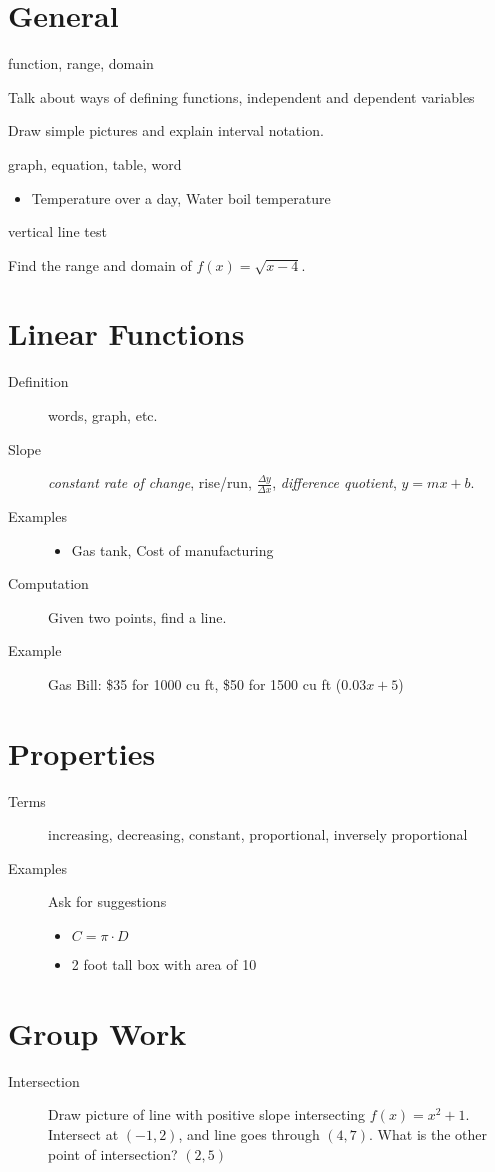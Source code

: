 \documentclass[11pt]{article}
\begin{document}
\drawtitle

\section*{General}
\begin{description}
\item[Definitions] function, range, domain
\item Talk about ways of defining functions, independent and dependent variables
\item Draw simple pictures and explain interval notation.
\item[Examples] graph, equation, table, word
  \begin{itemize}
  \item Temperature over a day, Water boil temperature
  \end{itemize}
\item[Check] vertical line test
\item[Example] Find the range and domain of $f(x)=\sqrt{x-4}$.
\end{description}

\section*{Linear Functions}
\begin{description}
\item[Definition] words, graph, etc.
\item[Slope] \textit{constant rate of change}, rise/run, $\frac{\Delta
    y}{\Delta x}$, \textit{difference quotient}, $y=mx+b$.
\item[Examples]
  \begin{itemize}
  \item Gas tank, Cost of manufacturing
  \end{itemize}
\item[Computation] Given two points, find a line.
\item[Example] Gas Bill: \$35 for 1000 cu ft, \$50 for 1500 cu ft ($0.03x+5$)

\end{description}

\section*{Properties}
\begin{description}
\item[Terms] increasing, decreasing, constant, proportional, inversely
  proportional
\item[Examples] Ask for suggestions
  \begin{itemize}
  \item $C=\pi\cdot D$
  \item 2 foot tall box with area of 10
  \end{itemize}
\end{description}

\section*{Group Work}
\begin{description}
\item[Intersection] Draw picture of line with positive slope
  intersecting $f(x)=x^2+1$.  Intersect at $(-1,2)$, and line goes
  through $(4,7)$.  What is the other point of intersection? $(2,5)$
\end{description}
\end{document}

